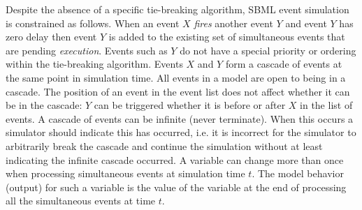 Despite the absence of a specific tie-breaking algorithm, SBML
event simulation is constrained as follows. When an event $X$
\emph{fires} another event $Y$ and event $Y$ has zero delay then
event $Y$ is added to the existing set of simultaneous events that
are pending \emph{execution}.  Events such as $Y$ do not have a
special priority or ordering within the tie-breaking algorithm.
Events $X$ and $Y$ form a cascade of events at the same point in
simulation time.  All events in a model are open to being in a
cascade.  The position of an event in the event list does not
affect whether it can be in the cascade: $Y$ can be triggered
whether it is before or after $X$ in the list of events.  A
cascade of events can be infinite (never terminate).  When this
occurs a simulator should indicate this has occurred, i.e. it is
incorrect for the simulator to arbitrarily break the cascade and
continue the simulation without at least indicating the infinite
cascade occurred. A variable can change more than once when
processing simultaneous events at simulation time $t$.  The model
behavior (output) for such a variable is the value of the variable
at the end of processing all the simultaneous events at time $t$.






